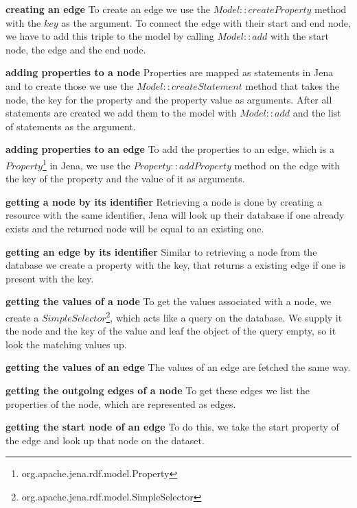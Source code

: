 \textbf{creating an edge} \newline
To create an edge we use the $ Model::createProperty $ method with the $ key $ as the argument.
To connect the edge with their start and end node,
we have to add this triple to the model by calling $ Model::add $ with the start node,
the edge and the end node.

\textbf{adding properties to a node} \newline
Properties are mapped as statements in Jena and to create those we use the $ Model::createStatement $ method that takes the node, the key for the property and the property value as arguments.
After all statements are created we add them to the model with $ Model::add $ and the list of statements as the argument.

\textbf{adding properties to an edge} \newline
To add the properties to an edge,
which is a $ Property $\footnote{org.apache.jena.rdf.model.Property} in Jena,
we use the $ Property::addProperty $ method on the edge with the key of the property and the value of it as arguments.

\textbf{getting a node by its identifier} \newline
Retrieving a node is done by creating a resource with the same identifier,
Jena will look up their database if one already exists and the returned node will be equal to an existing one.

\textbf{getting an edge by its identifier} \newline
Similar to retrieving a node from the database we create a property with the key,
that returns a existing edge if one is present with the key.

\textbf{getting the values of a node} \newline
To get the values associated with a node,
we create a $ SimpleSelector $\footnote{org.apache.jena.rdf.model.SimpleSelector},
which acts like a query on the database.
We supply it the node and the key of the value and leaf the object of the query empty,
so it look the matching values up.

\textbf{getting the values of an edge} \newline
The values of an edge are fetched the same way.

\textbf{getting the outgoing edges of a node} \newline
To get these edges we list the properties of the node,
which are represented as edges.

\textbf{getting the start node of an edge} \newline
To do this,
we take the start property of the edge and look up that node on the dataset.

